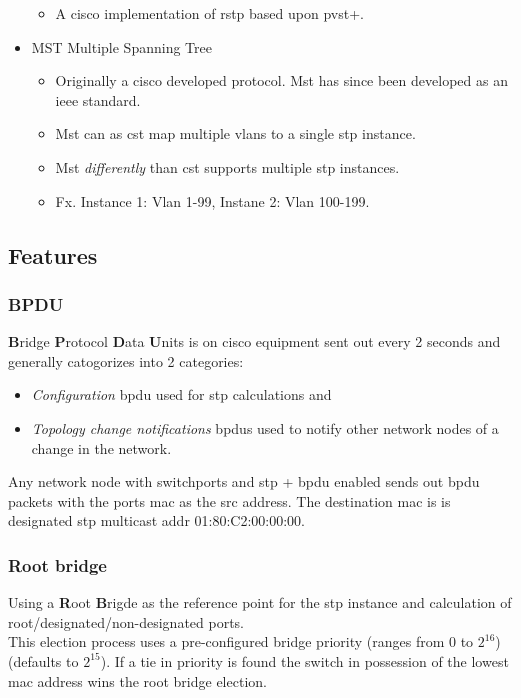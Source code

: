 \begin{itemize}
    \begin{itemize}
        \item A cisco implementation of rstp based upon pvst+.
    \end{itemize}
    \item MST {\scriptsize Multiple Spanning Tree}
    \begin{itemize}
        \item Originally a cisco developed protocol. Mst has since been developed as an ieee standard.
        \item Mst can as cst map multiple vlans to a single stp instance.
        \item Mst \textit{differently} than cst supports multiple stp instances.
        \item Fx. Instance 1: Vlan 1-99, Instane 2: Vlan 100-199.
    \end{itemize}
\end{itemize}

\subsection{Features}

\subsubsection{BPDU}
\textbf{B}ridge \textbf{P}rotocol \textbf{D}ata \textbf{U}nits is on cisco equipment sent out every 2 seconds and generally catogorizes into 2 categories:
\begin{itemize}
    \item \textit{Configuration} bpdu used for stp calculations and
    \item \textit{Topology change notifications} bpdus used to notify other network nodes of a change in the network.
\end{itemize}

Any network node with switchports and stp + bpdu enabled sends out bpdu packets with the ports mac as the src address. The destination mac is is designated stp multicast addr 01:80:C2:00:00:00.

\subsubsection{Root bridge}
Using a \textbf{R}oot \textbf{B}rigde as the reference point for the stp instance and calculation of root/designated/non-designated ports.\\This election process uses a pre-configured bridge priority (ranges from $0$ to $2^{16}$) (defaults to $2^{15}$). If a tie in priority is found the switch in possession of the lowest mac address wins the root bridge election.

